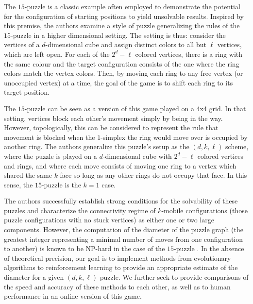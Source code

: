 \documentclass{article}
\theoremstyle{definition}
\begin{document}
\title{}
\author{}
\date{}
\maketitle


The $15$-puzzle is a classic example often employed to demonstrate the potential for the configuration of starting positions to yield unsolvable results. Inspired by this premise, the authors \cite{beyer2023higher} examine a style of puzzle generalizing the rules of the $15$-puzzle in a higher dimensional setting. The setting is thus: consider the vertices of a $d$-dimensional cube and assign distinct colors to all but $\ell$ vertices, which are left open. For each of the $2^d-\ell$ colored vertices, there is a ring with the same colour and the target configuration consists of the one where the ring colors match the vertex colors. Then, by moving each ring to any free vertex (or unoccupied vertex) at a time, the goal of the game is to shift each ring to its target position. 

The $15$-puzzle can be seen as a version of this game played on a 4x4 grid. In that setting, vertices block each other's movement simply by being in the way. However, topologically, this can be considered to represent the rule that movement is blocked when the $1$-simplex the ring would move over is occupied by another ring. The authors generalize this puzzle's setup as the $(d,k,\ell)$ scheme, where the puzzle is played on a $d$-dimensional cube with $2^d-\ell$ colored vertices and rings, and where each move consists of moving one ring to a vertex which shared the same $k$-face so long as any other rings do not occupy that face. In this sense, the $15$-puzzle is the $k=1$ case.

The authors successfully establish strong conditions for the solvability of these puzzles and characterize the connectivity regime of $k$-mobile configurations (those puzzle configurations with no stuck vertices) as either one or two large components. However, the computation of the diameter of the puzzle graph (the greatest integer representing a minimal number of moves from one configuration to another) is known to be NP-hard in the case of the $15$-puzzle \cite{goldreich2011finding}. In the absence of theoretical precision, our goal is to implement methods from evolutionary algorithms to reinforcement learning to provide an appropriate estimate of the diameter for a given $(d,k,\ell)$ puzzle. We further seek to provide comparisons of the speed and accuracy of these methods to each other, as well as to human performance in an online version of this game.
\end{document}
